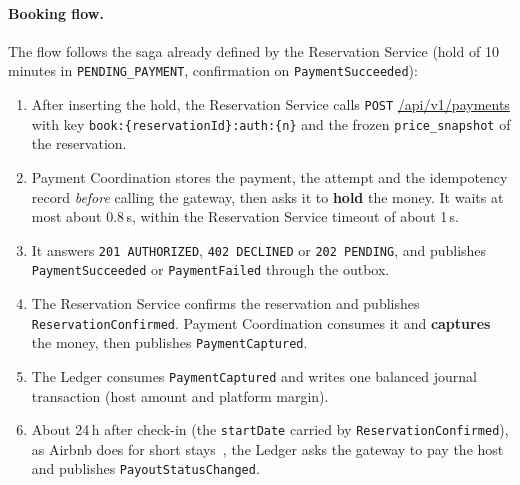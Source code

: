\paragraph{Booking flow.} The flow follows the saga already defined by the
Reservation Service (hold of 10 minutes in \texttt{PENDING\_\allowbreak PAYMENT},
confirmation on \texttt{Payment\allowbreak Succeeded}):
\begin{enumerate}
  \item After inserting the hold, the Reservation Service calls
    \texttt{POST} \url{/api/v1/payments} with key
    \texttt{book:\allowbreak \{reservation\allowbreak Id\}:\allowbreak auth:\allowbreak \{n\}} and the frozen
    \texttt{price\_\allowbreak snapshot} of the reservation.
  \item Payment Coordination stores the payment, the attempt and the
    idempotency record \emph{before} calling the gateway, then asks it to
    \textbf{hold} the money. It waits at most about 0.8\,s, within the
    Reservation Service timeout of about 1\,s.
  \item It answers \texttt{201 AUTHORIZED}, \texttt{402 DECLINED} or
    \texttt{202 PENDING}, and publishes \texttt{Payment\allowbreak Succeeded} or
    \texttt{Payment\allowbreak Failed} through the outbox.
  \item The Reservation Service confirms the reservation and publishes
    \texttt{Reservation\allowbreak Confirmed}. Payment Coordination consumes it and
    \textbf{captures} the money, then publishes \texttt{Payment\allowbreak Captured}.
  \item The Ledger consumes \texttt{Payment\allowbreak Captured} and writes one balanced
    journal transaction (host amount and platform margin).
  \item About 24\,h after check-in (the \texttt{startDate} carried by
    \texttt{Reservation\allowbreak Confirmed}), as Airbnb does for short
    stays~\cite{airbnb-payouts}, the Ledger asks the gateway to pay the host
    and publishes \texttt{Payout\allowbreak Status\allowbreak Changed}.
\end{enumerate}

